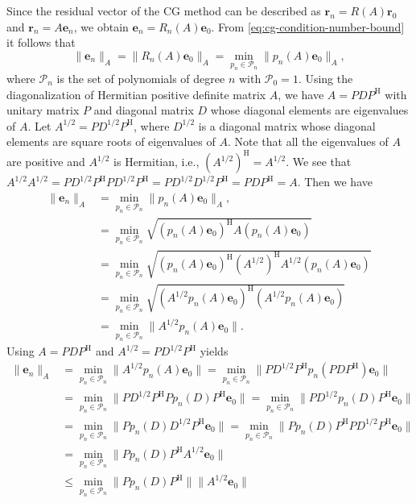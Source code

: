 \begin{Proof}
{Since the residual vector of the CG method can be described as $\bm r_n=R(A)\bm r_0$ and $\bm r_n=A\bm e_n$, we obtain $\bm e_n=R_n(A)\bm e_0$. From \eqref{eq:cg-condition-number-bound} it follows that}
\[\|\bm e_n\|_A=\|R_n(A)\bm e_0\|_A=\min_{p_n\in\mathcal P_n}\|p_n(A)\bm e_0\|_A,\]
{where $\mathcal P_n$ is the set of polynomials of degree $n$ with $\mathcal P_0=1$. Using the diagonalization of Hermitian positive definite matrix $A$, we have $A=PDP^{\mathrm H}$ with unitary matrix $P$ and diagonal matrix $D$ whose diagonal elements are eigenvalues of $A$. Let $A^{1/2}=PD^{1/2}P^{\mathrm H}$, where $D^{1/2}$ is a diagonal matrix whose diagonal elements are square roots of eigenvalues of $A$. Note that all the eigenvalues of $A$ are positive and $A^{1/2}$ is Hermitian, i.e., $(A^{1/2})^{\mathrm H}=A^{1/2}$. We see that $A^{1/2}A^{1/2}=PD^{1/2}P^{\mathrm H}PD^{1/2}P^{\mathrm H}=PD^{1/2}D^{1/2}P^{\mathrm H}=PDP^{\mathrm H}=A$. Then we have}
\[\begin{aligned}
\|\bm e_n\|_A&=\min_{p_n\in\mathcal P_n}\|p_n(A)\bm e_0\|_A,\\
&=\min_{p_n\in\mathcal P_n}\sqrt{(p_n(A)\bm e_0)^{\mathrm H}A(p_n(A)\bm e_0)}\\
&=\min_{p_n\in\mathcal P_n}\sqrt{(p_n(A)\bm e_0)^{\mathrm H}(A^{1/2})^{\mathrm H}A^{1/2}(p_n(A)\bm e_0)}\\
&=\min_{p_n\in\mathcal P_n}\sqrt{(A^{1/2}p_n(A)\bm e_0)^{\mathrm H}(A^{1/2}p_n(A)\bm e_0)}\\
&=\min_{p_n\in\mathcal P_n}\|A^{1/2}p_n(A)\bm e_0\|.
\end{aligned}\]
{Using $A=PDP^{\mathrm H}$ and $A^{1/2}=PD^{1/2}P^{\mathrm H}$ yields}
\[\begin{aligned}
\|\bm e_n\|_A&=\min_{p_n\in\mathcal P_n}\|A^{1/2}p_n(A)\bm e_0\|=\min_{p_n\in\mathcal P_n}\|PD^{1/2}P^{\mathrm H}p_n(PDP^{\mathrm H})\bm e_0\|\\
&=\min_{p_n\in\mathcal P_n}\|PD^{1/2}P^{\mathrm H}Pp_n(D)P^{\mathrm H}\bm e_0\|
=\min_{p_n\in\mathcal P_n}\|PD^{1/2}p_n(D)P^{\mathrm H}\bm e_0\|\\
&=\min_{p_n\in\mathcal P_n}\|Pp_n(D)D^{1/2}P^{\mathrm H}\bm e_0\|
=\min_{p_n\in\mathcal P_n}\|Pp_n(D)P^{\mathrm H}PD^{1/2}P^{\mathrm H}\bm e_0\|\\
&=\min_{p_n\in\mathcal P_n}\|Pp_n(D)P^{\mathrm H}A^{1/2}\bm e_0\|\\
&\le\min_{p_n\in\mathcal P_n}\|Pp_n(D)P^{\mathrm H}\|\|A^{1/2}\bm e_0\|\\

\end{aligned}\]
\end{Proof}
